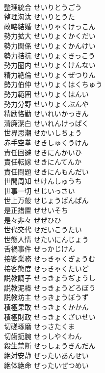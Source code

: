 \documentclass[8pt]{extreport}
\begin{document}
\begin{CJK}{UTF8}{min}
\\	整理統合	せいりとうごう	
\\	整理淘汰	せいりとうた	
\\	政略結婚	せいりゃくけっこん	
\\	勢力拡大	せいりょくかくだい	
\\	勢力関係	せいりょくかんけい	
\\	勢力拮抗	せいりょくきっこう	
\\	勢力圏内	せいりょくけんない	
\\	精力絶倫	せいりょくぜつりん	
\\	勢力伯仲	せいりょくはくちゅう	
\\	勢力範囲	せいりょくはんい	
\\	勢力分野	せいりょくぶんや	
\\	精励恪勤	せいれいかっきん	
\\	清廉潔白	せいれんけっぱく	
\\	世界思潮	せかいしちょう	
\\	赤手空拳	せきしゅくうけん	
\\	責任回避	せきにんかいひ	
\\	責任転嫁	せきにんてんか	
\\	責任問題	せきにんもんだい	
\\	世間周知	せけんしゅうち	
\\	世事一切	せじいっさい	
\\	世上万般	せじょうばんぱん	
\\	是正措置	ぜせいそち	
\\	是々非々	ぜぜひひ	
\\	世代交代	せだいこうたい	
\\	世態人情	せたいにんじょう	
\\	舌禍事件	ぜっかじけん	
\\	接客業務	せっきゃくぎょうむ	
\\	接客態度	せっきゃくたいど	
\\	説教調子	せっきょうぢょうし	
\\	説教泥棒	せっきょうどろぼう	
\\	説教坊主	せっきょうぼうず	
\\	積極果敢	せっきょくかかん	
\\	積極財政	せっきょくざいせい	
\\	切磋琢磨	せっさたくま	
\\	切歯扼腕	せっしやくわん	
\\	殺生禁断	せっしょうきんだん	
\\	絶対安静	ぜったいあんせい	
\\	絶体絶命	ぜったいぜつめい	

\end{CJK}
\end{document}
